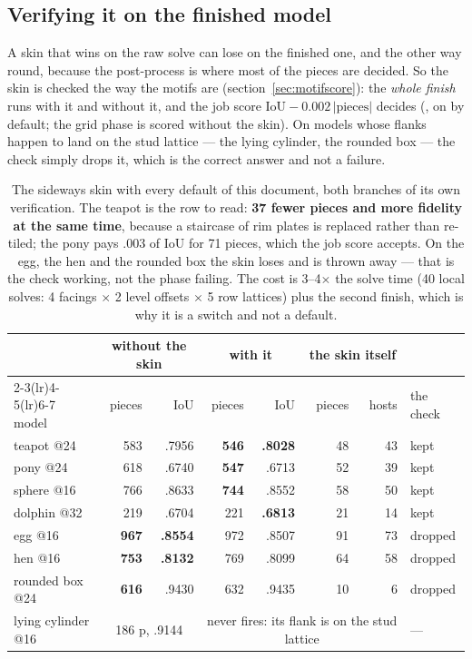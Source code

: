 \subsection{Verifying it on the finished model}
A skin that wins on the raw solve can lose on the finished one, and the other way round, because the post-process is where most of
the pieces are decided. So the skin is checked the way the motifs are (section~\ref{sec:motifscore}): the \emph{whole finish} runs
with it and without it, and the job score $\mathrm{IoU} - 0.002\,\lvert\text{pieces}\rvert$ decides (, on by
default; the grid phase is scored without the skin). On models whose flanks happen to land on the stud lattice --- the lying
cylinder, the rounded box --- the check simply drops it, which is the correct answer and not a failure.

\begin{table}[H]
\centering\small
\begin{tabular}{lrrrrrrl}
\toprule
 & \multicolumn{2}{c}{without the skin} & \multicolumn{2}{c}{with it} & \multicolumn{2}{c}{the skin itself} & \\
\cmidrule(lr){2-3}\cmidrule(lr){4-5}\cmidrule(lr){6-7}
model & pieces & IoU & pieces & IoU & pieces & hosts & the check \\
\midrule
teapot @24        & 583 & .7956 & \textbf{546} & \textbf{.8028} & 48 & 43 & kept \\
pony @24          & 618 & .6740 & \textbf{547} & .6713 & 52 & 39 & kept \\
sphere @16        & 766 & .8633 & \textbf{744} & .8552 & 58 & 50 & kept \\
dolphin @32       & 219 & .6704 & 221 & \textbf{.6813} & 21 & 14 & kept \\
\midrule
egg @16           & \textbf{967} & \textbf{.8554} & 972 & .8507 & 91 & 73 & dropped \\
hen @16           & \textbf{753} & \textbf{.8132} & 769 & .8099 & 64 & 58 & dropped \\
rounded box @24   & \textbf{616} & .9430 & 632 & .9435 & 10 & 6 & dropped \\
lying cylinder @16 & \multicolumn{2}{c}{186 p, .9144} & \multicolumn{4}{c}{never fires: its flank is on the stud lattice} & --- \\
\bottomrule
\end{tabular}
\caption{The sideways skin with every default of this document, both branches of its own verification. The teapot is the row to
read: \textbf{37 fewer pieces and more fidelity at the same time}, because a staircase of rim plates is replaced rather than
re-tiled; the pony pays .003 of IoU for 71 pieces, which the job score accepts. On the egg, the hen and the rounded box the skin
loses and is thrown away --- that is the check working, not the phase failing. The cost is 3--4$\times$ the solve time (40 local
solves: 4 facings $\times$ 2 level offsets $\times$ 5 row lattices) plus the second finish, which is why it is a switch and not a
default.}
\end{table}

